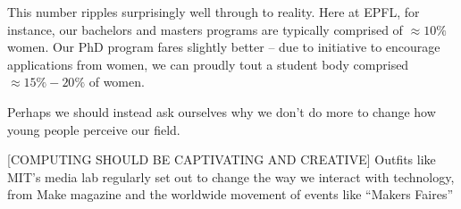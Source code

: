 \documentclass[acmtocl]{acmtrans2m}
\newcommand{\comment}[1]{}
\begin{document}
This number ripples surprisingly well through to reality. Here at EPFL, for
instance, our bachelors and masters programs are typically comprised of
$\approx10\%$ women. Our PhD program fares slightly better -- due to
initiative to encourage applications from women, we can proudly tout a
student body comprised $\approx15\%-20\%$ of women.

Perhaps we should instead ask ourselves why we don't do more to change how
young people perceive our field.

[COMPUTING SHOULD BE CAPTIVATING AND CREATIVE]
Outfits like MIT's media lab regularly set out to change the way we interact with technology, from
Make magazine and the worldwide movement of events like ``Makers Faires''







\end{document}
